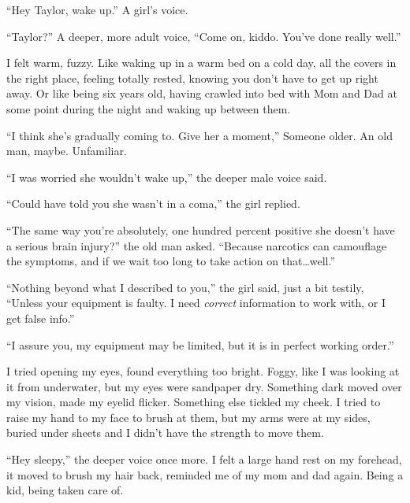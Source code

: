 





``Hey Taylor, wake up.''  A girl's voice.



``Taylor?''  A deeper, more adult voice, ``Come on, kiddo.  You've done really well.''



I felt warm, fuzzy.  Like waking up in a warm bed on a cold day, all the covers in the right place, feeling totally rested, knowing you don't have to get up right away.  Or like being six years old, having crawled into bed with Mom and Dad at some point during the night and waking up between them.



``I think she's gradually coming to.  Give her a moment,'' Someone older.  An old man, maybe.  Unfamiliar.



``I was worried she wouldn't wake up,'' the deeper male voice said.



``Could have told you she wasn't in a coma,'' the girl replied.



``The same way you're absolutely, one hundred percent positive she doesn't have a serious brain injury?'' the old man asked. ``Because narcotics can camouflage the symptoms, and if we wait too long to take action on that\ldots well.''



``Nothing beyond what I described to you,'' the girl said, just a bit testily, ``Unless your equipment is faulty.  I need \emph{correct} information to work with, or I get false info.''



``I assure you, my equipment may be limited, but it is in perfect working order.''



I tried opening my eyes, found everything too bright.  Foggy, like I was looking at it from underwater, but my eyes were sandpaper dry.  Something dark moved over my vision, made my eyelid flicker.  Something else tickled my cheek.  I tried to raise my hand to my face to brush at them, but my arms were at my sides, buried under sheets and I didn't have the strength to move them.



``Hey sleepy,'' the deeper voice once more.  I felt a large hand rest on my forehead, it moved to brush my hair back, reminded me of my mom and dad again.  Being a kid, being taken care of.



